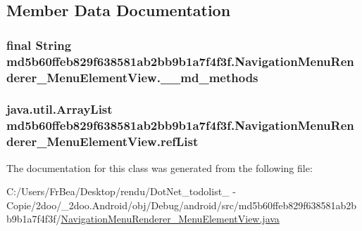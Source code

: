 \subsection{Member Data Documentation}
\hypertarget{classmd5b60ffeb829f638581ab2bb9b1a7f4f3f_1_1_navigation_menu_renderer___menu_element_view_04d38a07cbc75040c62aaa944c9b4174}{
\subsubsection[{\_\-\_\-md\_\-methods}]{\setlength{\rightskip}{0pt plus 5cm}final String {\bf md5b60ffeb829f638581ab2bb9b1a7f4f3f.NavigationMenuRenderer\_\-MenuElementView.\_\-\_\-md\_\-methods}}}
\label{classmd5b60ffeb829f638581ab2bb9b1a7f4f3f_1_1_navigation_menu_renderer___menu_element_view_04d38a07cbc75040c62aaa944c9b4174}


\hypertarget{classmd5b60ffeb829f638581ab2bb9b1a7f4f3f_1_1_navigation_menu_renderer___menu_element_view_87d2c9304a1e94e25442bab9d20cb5a8}{
\subsubsection[{refList}]{\setlength{\rightskip}{0pt plus 5cm}java.util.ArrayList {\bf md5b60ffeb829f638581ab2bb9b1a7f4f3f.NavigationMenuRenderer\_\-MenuElementView.refList}}}
\label{classmd5b60ffeb829f638581ab2bb9b1a7f4f3f_1_1_navigation_menu_renderer___menu_element_view_87d2c9304a1e94e25442bab9d20cb5a8}




The documentation for this class was generated from the following file:\begin{CompactItemize}
\item 
C:/Users/FrBea/Desktop/rendu/DotNet\_\-todolist\_ - Copie/2doo/\_\-2doo.Android/obj/Debug/android/src/md5b60ffeb829f638581ab2bb9b1a7f4f3f/\hyperlink{_navigation_menu_renderer___menu_element_view_8java}{NavigationMenuRenderer\_\-MenuElementView.java}\end{CompactItemize}
